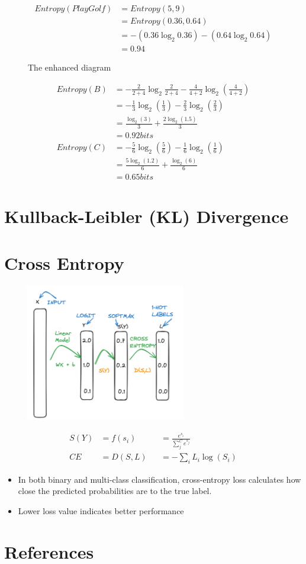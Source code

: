 \documentclass{article}
\begin{document}
\begin{align*}
    Entropy(Play Golf) &= Entropy(5,9) \\
    &= Entropy(0.36,0.64) \\
    &= -(0.36 \log_2 0.36) - (0.64 \log_2 0.64) \\
    &= 0.94
\end{align*}
\newpage  
\begin{figure}
  \centering
  
  \caption{The enhanced diagram}
\end{figure}
\begin{align*}
    Entropy(B) &= - \frac{2}{2+4} \log_2 \frac{2}{2+4} - \frac{4}{4+2} \log_2 (\frac{4}{4+2})\\
               &= -\frac{1}{3} \log_2(\frac{1}{3}) - \frac{2}{3} \log_2(\frac{2}{3}) \\
               &= \frac{\log_2(3)}{3} + \frac{2 \log_2(1.5)}{3} \\
               &= 0.92 bits\\ 
    Entropy(C) &= - \frac{5}{6} \log_2(\frac{5}{6}) - \frac{1}{6} \log_2(\frac{1}{6}) \\
               &= \frac{5 \log_2(1.2)}{6} + \frac{\log_2(6)}{6}\\
               &= 0.65 bits
\end{align*}
    

\section{Kullback-Leibler (KL) Divergence}

\section{Cross Entropy}
\begin{center}
    \includegraphics[width=9cm, height=6cm]{Topics/IMAGES/CrossEntropy1.png} 
\end{center}
\begin{align*}
    S(Y) &= f(s_i) &&= \frac{e^{s_i}}{\sum_j^C e^{s_j}} \\
    CE &= D(S,L) &&= - \sum_i L_i \log(S_i)
\end{align*}
\begin{itemize}
    \item In both binary and multi-class classification, cross-entropy loss calculates how close the predicted probabilities are to the true label.
    \item Lower loss value indicates better performance
\end{itemize}
\section{References}
\end{document}
